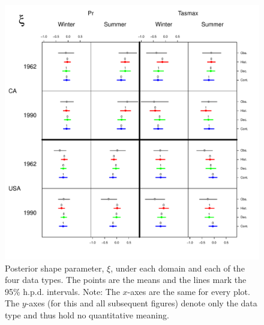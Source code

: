 \begin{figure}
\begin{center}
 \includegraphics[scale=0.72]{figs/shape.pdf}
\end{center}
\caption{Posterior shape parameter, $\xi$, under each domain and each of the four data types. The points are the means and the lines mark the 95\% h.p.d. intervals. Note: The $x$-axes are the same for every plot. The $y$-axes (for this and all subsequent figures) denote only the data type and thus hold no quantitative meaning.}
\label{ksi}
\end{figure}

